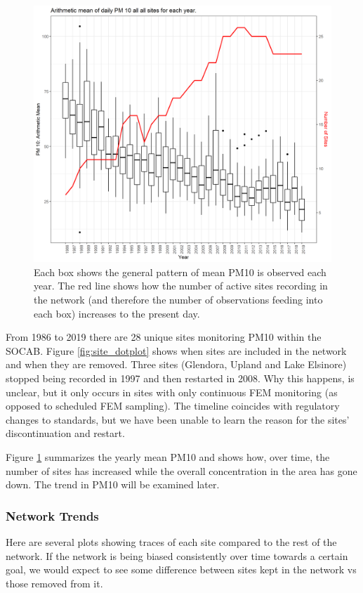 \begin{figure}[ht]
\centering
\includegraphics[width = \textwidth]{Figures/site_trend-ArthmM_NumSites.png}
\caption{Each box shows the general pattern of mean 
	PM10 is observed each year.  The red line shows how the number of active sites recording in the network (and therefore the number of observations feeding into each box) increases to the present day.}
\label{fig:site_trend-ArthmM_NumSites}
\end{figure} 

From 1986 to 2019 there are 28 unique sites monitoring \ac{PM10} within the \ac{SOCAB}. Figure \ref{fig:site_dotplot} shows when sites are included in the network and when they are removed.   Three sites (Glendora, Upland and Lake Elsinore) stopped being recorded in 1997 and then restarted in 2008. Why this happens, is unclear, but it only occurs in sites with only continuous \ac{FEM} monitoring (as opposed to scheduled \ac{FEM} sampling).  The timeline coincides with regulatory changes to standards, but we have been unable to learn the reason for the sites' discontinuation and restart.

Figure \ref{fig:site_trend-ArthmM_NumSites} summarizes the yearly mean \ac{PM10} and shows how, over time, the number of sites has increased while the overall concentration in the area has gone down. The trend in \ac{PM10} will be examined later. 

\subsubsection*{Network Trends}
\label{subsubsec:networktrends}
Here are several plots showing traces of each site compared to the rest of the network.  If the network is being biased consistently over time towards a certain goal, we would expect to see some difference between sites kept in the network vs those removed from it.  

